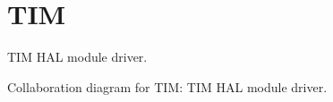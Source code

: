 \hypertarget{group__TIM}{}\section{T\+IM}
\label{group__TIM}


T\+IM H\+AL module driver.  


Collaboration diagram for T\+IM\+:
T\+IM H\+AL module driver. 

